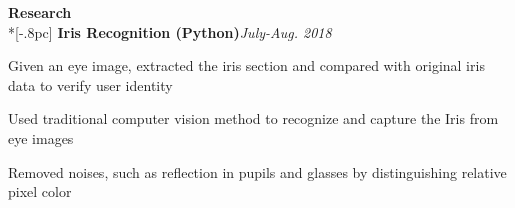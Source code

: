 

{\large \bf Research} \\*[-.8pc]
\underline{\hspace{6.3in}} 
{\bf Iris Recognition (Python)}\hfill {\it July-Aug. 2018}\\
\vspace{-4mm}
\begin{list2}
\item Given an eye image, extracted the iris section and compared with original iris data to verify user identity
\item Used traditional computer vision method to recognize and capture the Iris from eye images
\item Removed noises, such as reflection in pupils and glasses by distinguishing relative pixel color\\
\end{list2}

